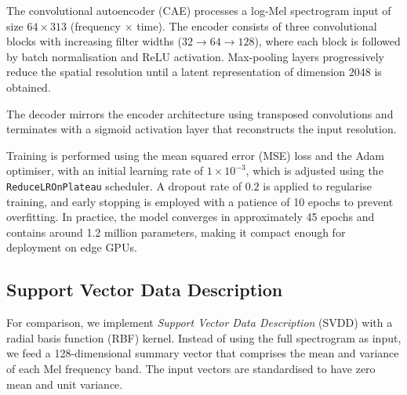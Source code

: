The convolutional autoencoder (CAE) processes a log-Mel spectrogram input of size $64 \times 313$ (frequency $\times$ time). The encoder consists of three convolutional blocks with increasing filter widths ($32 \rightarrow 64 \rightarrow 128$), where each block is followed by batch normalisation and ReLU activation. Max-pooling layers progressively reduce the spatial resolution until a latent representation of dimension $2048$ is obtained.

The decoder mirrors the encoder architecture using transposed convolutions and terminates with a sigmoid activation layer that reconstructs the input resolution.

Training is performed using the mean squared error (MSE) loss and the Adam optimiser, with an initial learning rate of $1 \times 10^{-3}$, which is adjusted using the \texttt{ReduceLROnPlateau} scheduler. A dropout rate of $0.2$ is applied to regularise training, and early stopping is employed with a patience of 10 epochs to prevent overfitting. In practice, the model converges in approximately 45 epochs and contains around 1.2 million parameters, making it compact enough for deployment on edge GPUs.

\subsection{Support Vector Data Description}
For comparison, we implement \textit{Support Vector Data Description} (SVDD) with a radial basis function (RBF) kernel. Instead of using the full spectrogram as input, we feed a 128-dimensional summary vector that comprises the mean and variance of each Mel frequency band. The input vectors are standardised to have zero mean and unit variance. 

